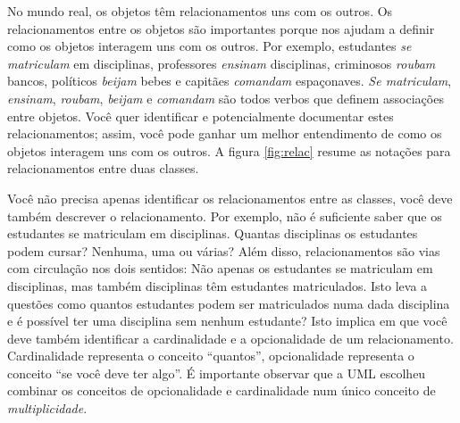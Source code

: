 No mundo real, os objetos têm relacionamentos uns com os outros. Os relacionamentos entre os objetos são importantes porque nos ajudam a definir como os objetos interagem uns com os outros. Por exemplo, estudantes \textit{se matriculam} em disciplinas, professores \textit{ensinam} disciplinas, criminosos \textit{roubam} bancos, políticos \textit{beijam} bebes e capitães \textit{comandam} espaçonaves. \textit{Se matriculam}, \textit{ensinam}, \textit{roubam}, \textit{beijam} e \textit{comandam} são todos verbos que definem associações entre objetos. Você quer identificar e potencialmente documentar estes relacionamentos; assim, você pode ganhar um melhor entendimento de como os objetos interagem uns com os outros. A figura \ref{fig:relac} resume as notações para relacionamentos entre duas classes.

Você não precisa apenas identificar os relacionamentos entre as classes, você deve também descrever o relacionamento. Por exemplo, não é suficiente saber que os estudantes se matriculam em disciplinas. Quantas disciplinas os estudantes podem cursar? Nenhuma, uma ou várias? Além disso, relacionamentos são vias com circulação nos dois sentidos: Não apenas os estudantes se matriculam em disciplinas, mas também disciplinas têm estudantes matriculados. Isto leva a questões como quantos estudantes podem ser matriculados numa dada disciplina e é possível ter uma disciplina sem nenhum estudante? Isto implica em que você deve também identificar a cardinalidade e a opcionalidade de um relacionamento. Cardinalidade representa o conceito ``quantos'', opcionalidade representa o conceito ``se você deve ter algo''. É importante observar que a UML escolheu combinar os conceitos de opcionalidade e cardinalidade num único conceito de \emph{multiplicidade}.

\noindent {}

